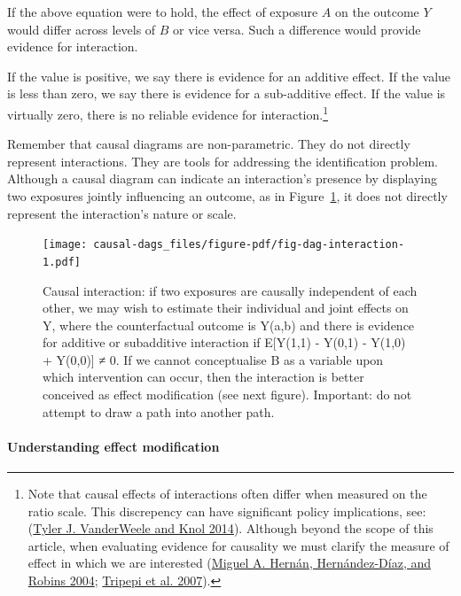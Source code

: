 \documentclass[
  singlecolumn]{article}
\let\oldparagraph\paragraph
\renewcommand{\paragraph}[1]{\oldparagraph{#1}\mbox{}}
\begin{document}
If the above equation were to hold, the effect of exposure \(A\) on the
outcome \(Y\) would differ across levels of \(B\) or vice versa. Such a
difference would provide evidence for interaction.

If the value is positive, we say there is evidence for an additive
effect. If the value is less than zero, we say there is evidence for a
sub-additive effect. If the value is virtually zero, there is no
reliable evidence for interaction.\footnote{Note that causal effects of
  interactions often differ when measured on the ratio scale. This
  discrepency can have significant policy implications, see:
  (\protect\hyperlink{ref-vanderweele2014}{Tyler J. VanderWeele and Knol
  2014}). Although beyond the scope of this article, when evaluating
  evidence for causality we must clarify the measure of effect in which
  we are interested (\protect\hyperlink{ref-hernuxe1n2004}{Miguel A.
  Hernán, Hernández-Díaz, and Robins 2004};
  \protect\hyperlink{ref-tripepi2007}{Tripepi et al. 2007}).}

Remember that causal diagrams are non-parametric. They do not directly
represent interactions. They are tools for addressing the identification
problem. Although a causal diagram can indicate an interaction's
presence by displaying two exposures jointly influencing an outcome, as
in Figure~\ref{fig-dag-interaction}, it does not directly represent the
interaction's nature or scale.

\begin{figure}

{\centering \texttt{[image: causal-dags\_files/figure-pdf/fig-dag-interaction-1.pdf]}

}

\caption{\label{fig-dag-interaction}Causal interaction: if two exposures
are causally independent of each other, we may wish to estimate their
individual and joint effects on Y, where the counterfactual outcome is
Y(a,b) and there is evidence for additive or subadditive interaction if
E{[}Y(1,1) - Y(0,1) - Y(1,0) + Y(0,0){]} ≠ 0. If we cannot conceptualise
B as a variable upon which intervention can occur, then the interaction
is better conceived as effect modification (see next figure). Important:
do not attempt to draw a path into another path.}

\end{figure}

\hypertarget{understanding-effect-modification}{%
\paragraph{\texorpdfstring{\textbf{Understanding effect
modification}}{Understanding effect modification}}\label{understanding-effect-modification}}
\end{document}
